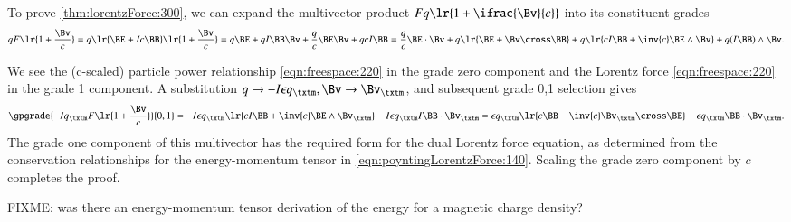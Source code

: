 To prove 
\cref{thm:lorentzForce:300},
we can expand the multivector product
\( F q \lr{ 1 + \ifrac{\Bv}{c} } \) into its constituent grades
\begin{dmath}\label{eqn:lorentzForce:40}
q F \lr{ 1 + \frac{\Bv}{c} }
=
q
\lr{ \BE + I c \BB }
\lr{ 1 + \frac{\Bv}{c} }
=
q \BE
+ q I \BB \Bv
+ \frac{q}{c} \BE \Bv
+ q c I \BB
=
  \frac{q}{c} \BE \cdot \Bv
+ q \lr{ \BE + \Bv \cross \BB }
+ q \lr{ c I \BB + \inv{c} \BE \wedge \Bv }
+ q (I \BB) \wedge \Bv.
\end{dmath}

We see the (c-scaled) particle power relationship
\cref{eqn:freespace:220}
in the grade zero component and the Lorentz force \cref{eqn:freespace:220} in the grade 1 component.
A substitution \( q \rightarrow -I \epsilon q_\txtm, \Bv \rightarrow \Bv_\txtm \), and subsequent grade 0,1 selection gives
\begin{dmath}\label{eqn:lorentzForce:320}
\gpgrade{
-I q_\txtm F \lr{ 1 + \frac{\Bv}{c} }
}{0,1}
=
- I \epsilon q_\txtm \lr{ c I \BB + \inv{c} \BE \wedge \Bv_\txtm }
- I \epsilon q_\txtm I \BB \cdot \Bv_\txtm
=
\epsilon q_\txtm \lr{ c \BB - \inv{c} \Bv_\txtm \cross \BE }
+
\epsilon q_\txtm \BB \cdot \Bv_\txtm.
\end{dmath}
The grade one component of this multivector has the
required form for the dual Lorentz force equation, as determined from the conservation relationships for the energy-momentum tensor in
\cref{eqn:poyntingLorentzForce:140}.
Scaling the grade zero component by \( c \) completes the proof.

FIXME: was there an energy-momentum tensor derivation of the energy for a magnetic charge density?

